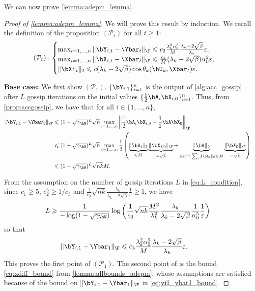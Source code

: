 \documentclass{article}
\theoremstyle{plain}
\theoremstyle{definition}
\theoremstyle{remark}
\begin{document}
We can now prove \cref{lemma:adepm_lemma}.

\begin{proof}[Proof of \cref{lemma:adepm_lemma}]

    We will prove this result by induction. We recall the definition of the proposition $(\mathcal{P}_t)$ for all $t \geqslant 1$:
    \begin{align*}
      (\mathcal{P}_t): \begin{cases}
      \max_{i=1, \dots, n} \Vert \bY_{i,t} - \Ybar_t \Vert_\F \leqslant c_3\frac{\lambda_k^2 \alpha_0^5}{M} \frac{\lambda_k-2\sqrt{\beta}}{\lambda_k}\varepsilon, \\
      \max_{i=1,\dots,n}\Vert\bX_{i,t} - \Xbar_t\Vert_\F \leqslant \frac{c_4}{M} (\lambda_k-2\sqrt{\beta})\alpha_0^2\varepsilon,\\ 
      \Vert\bXi_t\Vert_2 \leqslant c (\lambda_k - 2\sqrt{\beta}) \cos \theta_k(\bU_k, \Xbar_t)\varepsilon.
    \end{cases}
    \end{align*}

  
  \textbf{Base case:} We first show $(\mathcal{P}_1)$. $\{\bY_{i,1}\}_{i=1}^n$ is the output of \cref{alg:acc_gossip} after $L$ gossip iterations on the initial values $\{\frac{1}{2}\bA_i \bX_{i,0}\}_{i=1}^n$. Thus, from \cref{prop:accgossip}, we have that for all $i\in \{1, \dots, n\}$,
  \begin{align*}
    \Vert \bY_{i,1} - \Ybar_1 \Vert_\F & \leqslant (1-\sqrt{\gamma_\bW})^L \sqrt{n} \max_{i=1, \dots, n} \left\Vert \frac{1}{2}\bA_i \bX_{i,0} - \frac{1}{2}\bA\bX_0\right\Vert_\F \\
    & \leqslant (1-\sqrt{\gamma_\bW})^L \sqrt{n} \max_{i=1,\dots, n} \frac{1}{2}\left(\underbrace{\Vert \bA_i \Vert_2}_{\leqslant M} \underbrace{\Vert \bX_{i,0} \Vert_\F}_{=\sqrt{k}} + \underbrace{\Vert \bA \Vert_2}_{\leqslant n^{-1}\sum_i \Vert\bA_i\Vert_2 \leqslant M} \underbrace{\Vert \bX_{0} \Vert_\F}_{=\sqrt{k}}  \right) \\
    & \leqslant (1-\sqrt{\gamma_\bW})^L \sqrt{nk} M.
  \end{align*}

  From the assumption on the number of gossip iterations $L$ in \eqref{eq:L_condition}, since $c_1 \geqslant 5$, $c_2^5 \geqslant 1/c_3 $ and $\frac{1}{c_3}\sqrt{nk}\frac{\lambda_k}{\lambda_k-2\sqrt{\beta}}\frac{1}{\varepsilon} \geqslant1$, we have
  \begin{align*}
    L \geqslant \frac{1}{-\log(1-\sqrt{\gamma_\bW})} \log\left(\frac{1}{c_3}\sqrt{nk} \frac{M^2}{\lambda_k^2} \frac{\lambda_k}{\lambda_k-2\sqrt{\beta}}\frac{1}{\alpha_0^5} \frac{1}{\varepsilon}\right)
  \end{align*}
  so that
  \begin{align}\label{eq:yi1_ybar1_bound}
    \Vert \bY_{i,1} - \Ybar_1 \Vert_\F & \leqslant c_3\frac{\lambda_k^2 \alpha_0^5}{M} \frac{\lambda_k-2\sqrt{\beta}}{\lambda_k}\varepsilon.
  \end{align}
  This proves the first point of $(\mathcal{P}_1)$. The second point of is the bound \eqref{eq:xdiff_bound} from \cref{lemma:allbounds_adepm}, whose assumptions are satisfied because of the bound on $\Vert \bY_{i,1} - \Ybar_1 \Vert_\F$ in \eqref{eq:yi1_ybar1_bound}.


\end{proof}
\end{document}
